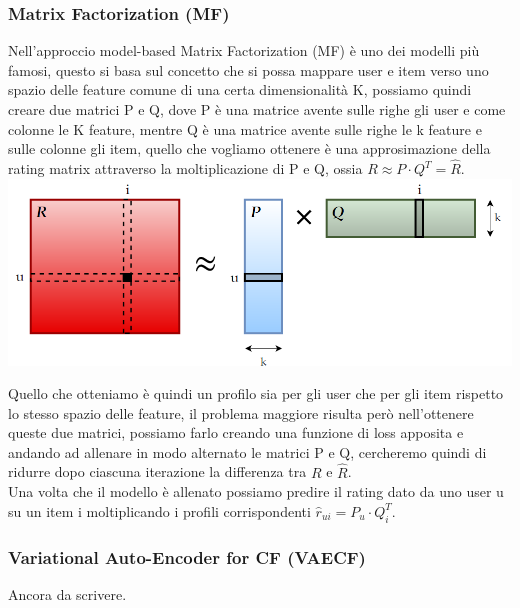 \subsubsection{Matrix Factorization (MF)}
Nell'approccio model-based Matrix Factorization (MF) è uno dei modelli più famosi, questo si basa sul concetto che si possa mappare user e item verso uno spazio delle feature comune di una certa dimensionalità K, possiamo quindi creare due matrici P e Q, dove P è una matrice avente sulle righe gli user e come colonne le K feature, mentre Q è una matrice avente sulle righe le k feature e sulle colonne gli item, quello che vogliamo ottenere è una approsimazione della rating matrix attraverso la moltiplicazione di P e Q, ossia $R \approx P \cdot Q^{T} = \hat{R}$.\\
\includegraphics[width=14.5cm]{figures/MF_disegno}

Quello che otteniamo è quindi un profilo sia per gli user che per gli item rispetto lo stesso spazio delle feature, il problema maggiore risulta però nell'ottenere queste due matrici, possiamo farlo creando una funzione di loss apposita e andando ad allenare in modo alternato le matrici P e Q, cercheremo quindi di ridurre dopo ciascuna iterazione la differenza tra $R$ e $\hat{R}$.\\
Una volta che il modello è allenato possiamo predire il rating dato da uno user u su un item i moltiplicando i profili corrispondenti $\hat{r}_{ui} = P_u \cdot Q_{i}^{T}$.

\subsubsection{Variational Auto-Encoder for CF (VAECF)}
Ancora da scrivere.

